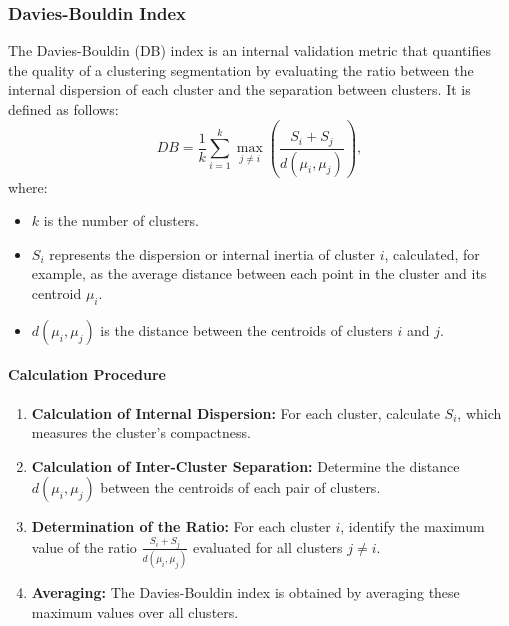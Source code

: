 \documentclass[10pt]{article}
\begin{document}
\subsubsection{Davies-Bouldin Index}
The Davies-Bouldin (DB) index is an internal validation metric that quantifies the quality of a clustering segmentation by evaluating the ratio between the internal dispersion of each cluster and the separation between clusters. It is defined as follows:
\[
DB = \frac{1}{k} \sum_{i=1}^{k} \max_{j \neq i} \left( \frac{S_i + S_j}{d(\mu_i, \mu_j)} \right),
\]
where:
\begin{itemize}
    \item $k$ is the number of clusters.
    \item $S_i$ represents the dispersion or internal inertia of cluster $i$, calculated, for example, as the average distance between each point in the cluster and its centroid $\mu_i$.
    \item $d(\mu_i, \mu_j)$ is the distance between the centroids of clusters $i$ and $j$.
\end{itemize}

\paragraph{Calculation Procedure}
\begin{enumerate}
    \item \textbf{Calculation of Internal Dispersion:} For each cluster, calculate $S_i$, which measures the cluster's compactness.
    \item \textbf{Calculation of Inter-Cluster Separation:} Determine the distance $d(\mu_i, \mu_j)$ between the centroids of each pair of clusters.
    \item \textbf{Determination of the Ratio:} For each cluster $i$, identify the maximum value of the ratio \(\frac{S_i + S_j}{d(\mu_i, \mu_j)}\) evaluated for all clusters $j \neq i$.
    \item \textbf{Averaging:} The Davies-Bouldin index is obtained by averaging these maximum values over all clusters.
\end{enumerate}
\end{document}
